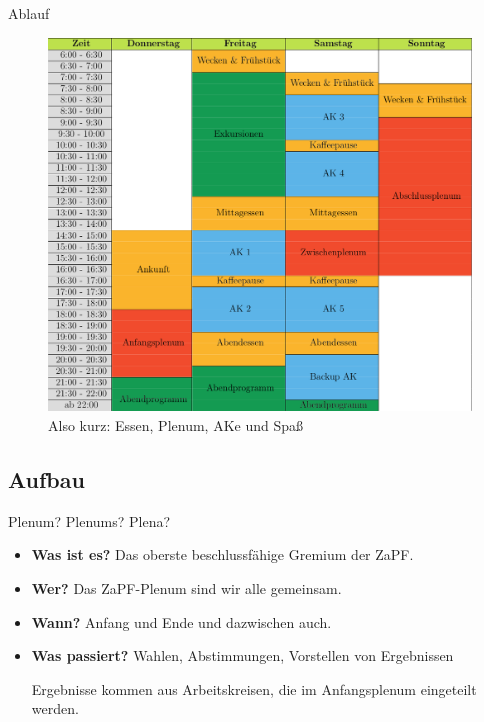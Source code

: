\documentclass[compress,]{beamer}
\begin{document}
\begin{frame}{Ablauf}

  \begin{figure}
    \centering
    \includegraphics[scale=0.35]{./fig/ablaufplan_frankfurt_wise2015}

    \caption{Also kurz: Essen, Plenum, AKe und Spaß}
  \end{figure}

\end{frame}


\subsection{Aufbau}

\begin{frame}{Plenum? Plenums? Plena?}

  \begin{itemize}[<+->]
  \item \textbf{Was ist es?} Das oberste beschlussfähige Gremium der ZaPF.
  \item \textbf{Wer?} Das ZaPF-Plenum sind wir alle gemeinsam.
  \item \textbf{Wann?} Anfang und Ende und dazwischen auch.
  \item \textbf{Was passiert?} Wahlen, Abstimmungen, Vorstellen von Ergebnissen

    Ergebnisse kommen aus Arbeitskreisen, die im Anfangsplenum eingeteilt werden.
  \end{itemize}


\end{frame}
\end{document}
